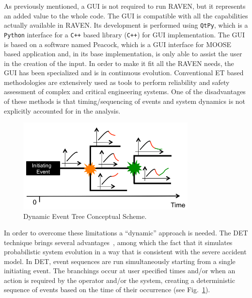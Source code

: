 \documentclass{mc2013}
\begin{document}
As previously mentioned, a GUI is not required to run RAVEN, but it represents an added value to the whole code. The GUI is compatible with all the capabilities actually available in RAVEN.  Its development is performed using \verb!QtPy!, which is a \verb!Python! interface for a \verb!C++! based library (\verb!C++!) for GUI implementation. The GUI is based on a software named Peacock, which is a GUI interface for MOOSE based application and, in its base implementation, is only able to assist the user in the creation of the input.  In order to make it fit all the RAVEN needs, the GUI has been specialized and is in continuous evolution.
\vspace{-5mm}
\label{sec:DET_methodology}
Conventional ET based methodologies are extensively used as tools to perform reliability and safety assessment of complex and critical engineering systems. 
One of the disadvantages of these methods is that timing/sequencing of events and system dynamics is not explicitly accounted for in the analysis.

\begin{figure}[h] 
  \centering
     \includegraphics[width=0.8\textwidth]{figures/DET_schemeFlow.png}
  \caption{Dynamic Event Tree Conceptual Scheme.}
   \label{fig:DET_schemeFlow}
\end{figure}
In order to overcome these limitations a ``dynamic'' approach is needed. The DET technique brings several advantages~\cite{ADAPTHakobyan}, among which the fact that it simulates probabilistic system evolution in a way that is consistent with the severe accident model. In DET,  event sequences are run simultaneously starting from a single initiating event. The branchings occur at user specified times and/or when an action is required by the operator and/or the system, creating a deterministic sequence of events based on the time of their occurrence (see Fig.~\ref{fig:DET_schemeFlow}). 
\end{document}

